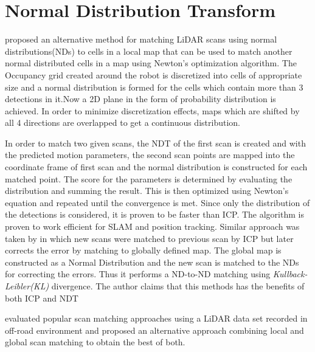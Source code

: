 \section{Normal Distribution Transform}
\cite{P.Biber} proposed an alternative method for matching LiDAR scans using normal distributions(NDs) to cells in a local map that can be used to match another normal distributed cells in a map using Newton's optimization algorithm. The Occupancy grid created around the robot is discretized into cells of appropriate size and a normal distribution is formed for the cells which contain more than 3 detections in it.Now a 2D plane in the form of probability distribution is achieved. In order to minimize discretization effects, maps which are shifted by all 4 directions are overlapped to get a continuous distribution.
\par
    In order to match two given scans, the NDT of the first scan is created and with the predicted motion parameters, the second scan points are mapped into the coordinate frame of first 
scan and the normal distribution is constructed for each matched point. The score for the parameters is determined by evaluating the distribution and summing the result. This is then optimized using Newton's equation and repeated until the convergence is met. Since only the distribution of the detections is considered, it is proven to be faster than ICP. The algorithm is proven to work efficient for SLAM and position tracking. Similar approach was taken by \cite{K.Ryu} in which new scans were matched to previous scan by ICP but later corrects the error by matching to globally defined map. The global map is constructed as a Normal Distribution and the new scan is matched to the NDs for correcting the errors. Thus it performs a ND-to-ND matching using \textit{Kullback-Leibler(KL)} divergence. The author claims that this methods has the benefits of both ICP and NDT
\par
\cite{HaoFU} evaluated popular scan matching approaches using a LiDAR data set recorded in off-road environment and proposed an alternative approach combining local and global  scan matching to obtain the best of both.

